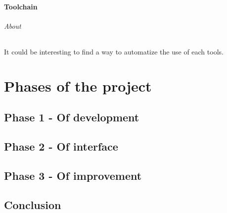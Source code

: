 \documentclass[a4paper, 12pt, openany]{book}
\begin{document}
\subsection{Toolchain}
\paragraph{About}
It could be interesting to find a way to automatize the use of each tools.
\part{Phases of the project}
\chapter{Phase 1 - Of development}
\chapter{Phase 2 - Of interface}
\chapter{Phase 3 - Of improvement}
\backmatter
\chapter{Conclusion}
\end{document}
